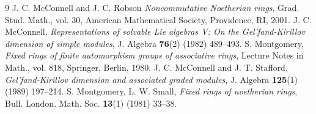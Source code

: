 \documentclass[12pt, a4paper]{amsart}
\begin{document}
\begin{thebibliography}{9}
{\sc J. C. McConnell and J. C. Robson}
{\em Noncommutative Noetherian rings},
Grad. Stud. Math., vol. 30,
American Mathematical Society, Providence, RI, 2001.%
{\sc J. C. McConnell},
{\em Representations of solvable Lie algebras V: On the Gel'fand-Kirillov dimension of simple modules},
J. Algebra {\bf 76}(2) (1982) 489--493.%
{\sc S. Montgomery},
{\em Fixed rings of finite automorphism groups of associative rings},
Lecture Notes in Math., vol. 818, Springer, Berlin, 1980.%
{\sc J. C. McConnell and J. T. Stafford},
{\em Gel'fand-Kirillov dimension and associated graded modules},
J. Algebra {\bf 125}(1) (1989) 197--214.%
{\sc S. Montgomery, L. W. Small},
{\em Fixed rings of noetherian rings},
Bull. London. Math. Soc. {\bf 13}(1) (1981) 33--38.%

\end{thebibliography}
\end{document}
